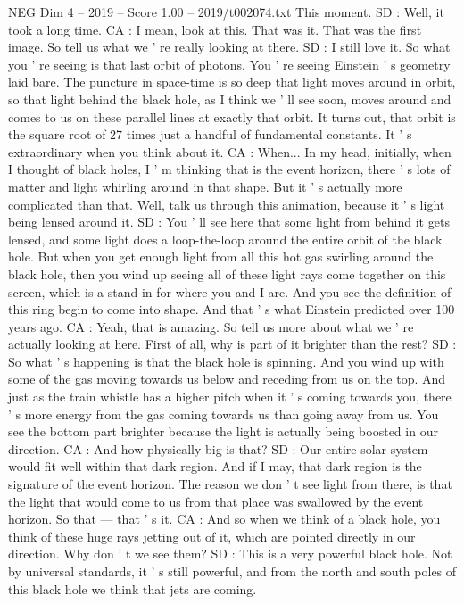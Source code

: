 \begin{textsample}{NEG Dim 4 – 2019 – Score 1.00 – 2019/t002074.txt}
This moment.
SD : Well, it took a long time.
CA : I mean, look at this.
That was it.
That was the first image.
So tell us what we ' re really looking at there.
SD : I still love it.
So what you ' re seeing is that last orbit of photons.
You ' re seeing Einstein ' s geometry laid bare.
The puncture in space-time is so deep that light moves around in orbit, so that light behind the black hole, as I think we ' ll see soon, moves around and comes to us on these parallel lines at exactly that orbit.
It turns out, that orbit is the square root of 27 times just a handful of fundamental constants.
It ' s extraordinary when you think about it.
CA : When...
In my head, initially, when I thought of black holes, I ' m thinking that is the event horizon, there ' s lots of matter and light whirling around in that shape.
But it ' s actually more complicated than that.
Well, talk us through this animation, because it ' s light being lensed around it.
SD : You ' ll see here that some light from behind it gets lensed, and some light does a loop-the-loop around the entire orbit of the black hole.
But when you get enough light from all this hot gas swirling around the black hole, then you wind up seeing all of these light rays come together on this screen, which is a stand-in for where you and I are.
And you see the definition of this ring begin to come into shape.
And that ' s what Einstein predicted over 100 years ago.
CA : Yeah, that is amazing.
So tell us more about what we ' re actually looking at here.
First of all, why is part of it brighter than the rest?
SD : So what ' s happening is that the black hole is spinning.
And you wind up with some of the gas moving towards us below and receding from us on the top.
And just as the train whistle has a higher pitch when it ' s coming towards you, there ' s more energy from the gas coming towards us than going away from us.
You see the bottom part brighter because the light is actually being boosted in our direction.
CA : And how physically big is that?
SD : Our entire solar system would fit well within that dark region.
And if I may, that dark region is the signature of the event horizon.
The reason we don ' t see light from there, is that the light that would come to us from that place was swallowed by the event horizon.
So that — that ' s it.
CA : And so when we think of a black hole, you think of these huge rays jetting out of it, which are pointed directly in our direction.
Why don ' t we see them?
SD : This is a very powerful black hole.
Not by universal standards, it ' s still powerful, and from the north and south poles of this black hole we think that jets are coming.

\end{textsample}
